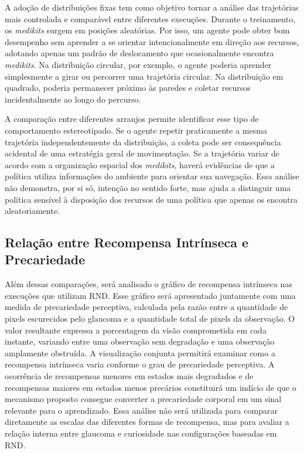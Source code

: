 A adoção de distribuições fixas tem como objetivo tornar a análise das trajetórias mais controlada e comparável entre diferentes execuções. Durante o treinamento, os \textit{medikits} surgem em posições aleatórias. Por isso, um agente pode obter bom desempenho sem aprender a se orientar intencionalmente em direção aos recursos, adotando apenas um padrão de deslocamento que ocasionalmente encontra \textit{medikits}. Na distribuição circular, por exemplo, o agente poderia aprender simplesmente a girar ou percorrer uma trajetória circular. Na distribuição em quadrado, poderia permanecer próximo às paredes e coletar recursos incidentalmente ao longo do percurso.

A comparação entre diferentes arranjos permite identificar esse tipo de comportamento estereotipado. Se o agente repetir praticamente a mesma trajetória independentemente da distribuição, a coleta pode ser consequência acidental de uma estratégia geral de movimentação. Se a trajetória variar de acordo com a organização espacial dos \textit{medikits}, haverá evidências de que a política utiliza informações do ambiente para orientar sua navegação. Essa análise não demonstra, por si só, intenção no sentido forte, mas ajuda a distinguir uma política sensível à disposição dos recursos de uma política que apenas os encontra aleatoriamente.

\subsection{Relação entre Recompensa Intrínseca e Precariedade}

Além dessas comparações, será analisado o gráfico de recompensa intrínseca nas execuções que utilizam RND. Esse gráfico será apresentado juntamente com uma medida de precariedade perceptiva, calculada pela razão entre a quantidade de pixels escurecidos pelo glaucoma e a quantidade total de pixels da observação. O valor resultante expressa a porcentagem da visão comprometida em cada instante, variando entre uma observação sem degradação e uma observação amplamente obstruída. A visualização conjunta permitirá examinar como a recompensa intrínseca varia conforme o grau de precariedade perceptiva. A ocorrência de recompensas menores em estados mais degradados e de recompensas maiores em estados menos precários constituirá um indício de que o mecanismo proposto consegue converter a precariedade corporal em um sinal relevante para o aprendizado. Essa análise não será utilizada para comparar diretamente as escalas das diferentes formas de recompensa, mas para avaliar a relação interna entre glaucoma e curiosidade nas configurações baseadas em RND.

